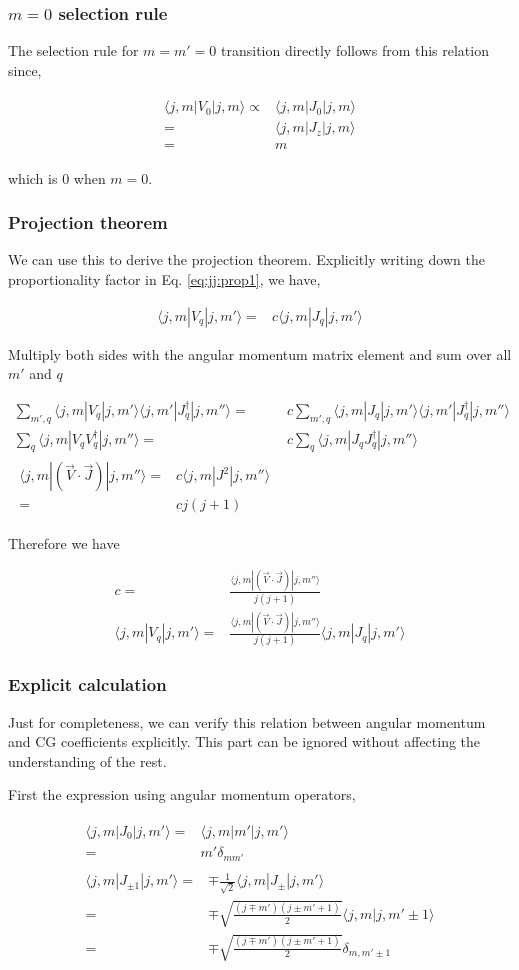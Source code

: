\documentclass[10pt,fleqn]{article}
\newcommand{\eqar}[1]
{
  \begin{align}
    #1
  \end{align}
}
\begin{document}
\subsubsection{$m=0$ selection rule}
The selection rule for $m=m'=0$ transition directly follows from this relation
since,
\eqar{
  \begin{split}
    \langle j,m|V_0|j,m\rangle\propto&\langle j,m|J_0|j,m\rangle\\
    =&\langle j,m|J_z|j,m\rangle\\
    =&m
  \end{split}
}
which is $0$ when $m=0$.

\subsubsection{Projection theorem}
We can use this to derive the projection theorem.
Explicitly writing down the proportionality factor in Eq. \ref{eq:jj:prop1}, we have,
\eqar{
  \langle j,m|V_q|j,m'\rangle=&c\langle j,m|J_q|j,m'\rangle
}
Multiply both sides with the angular momentum matrix element
and sum over all $m'$ and $q$
\eqar{
  \sum_{m',q}\langle j,m|V_q|j,m'\rangle\langle j,m'|J_q^\dagger|j,m''\rangle=&c\sum_{m',q}\langle j,m|J_q|j,m'\rangle\langle j,m'|J_q^\dagger|j,m''\rangle\\
  \sum_q\langle j,m|V_qV_q^\dagger|j,m''\rangle=&c\sum_q\langle j,m|J_qJ_q^\dagger|j,m''\rangle\\
  \begin{split}
    \langle j,m|(\vec V\cdot \vec J)|j,m''\rangle=&c\langle j,m|J^2|j,m''\rangle\\
    =&c j(j+1)
  \end{split}
}
Therefore we have
\eqar{
  c=&\frac{\langle j,m|(\vec V\cdot \vec J)|j,m''\rangle}{j(j+1)}\\
  \langle j,m|V_q|j,m'\rangle=&\frac{\langle j,m|(\vec V\cdot \vec J)|j,m''\rangle}{j(j+1)}\langle j,m|J_q|j,m'\rangle
}

\subsubsection{Explicit calculation}
Just for completeness, we can verify this relation between angular momentum
and CG coefficients explicitly.
This part can be ignored without affecting the understanding of the rest.

First the expression using angular momentum operators,
\eqar{
  \begin{split}
    \langle j,m|J_0|j,m'\rangle=&\langle j,m|m'|j,m'\rangle\\
    =&m'\delta_{mm'}
  \end{split}\\
  \begin{split}
    \langle j,m|J_{\pm1}|j,m'\rangle=&\mp\frac{1}{\sqrt2}\langle j,m|J_{\pm}|j,m'\rangle\\
    =&\mp\sqrt{\frac{(j\mp m')(j\pm m' + 1)}{2}}\langle j,m|j,m'\pm1\rangle\\
    =&\mp\sqrt{\frac{(j\mp m')(j\pm m' + 1)}{2}}\delta_{m,m'\pm1}
  \end{split}
}
\end{document}
